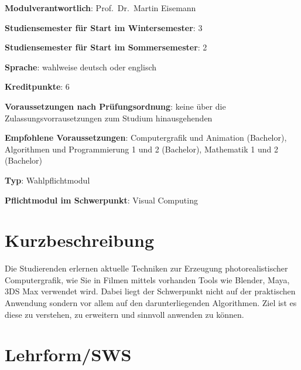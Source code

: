 \begin{modulHead}
\textbf{Modulverantwortlich}: Prof.~Dr.~Martin
Eisemann
\end{modulHead}
\begin{modulHead}
\textbf{Studiensemester für
Start im Wintersemester}:
3
\end{modulHead}
\begin{modulHead}
\textbf{Studiensemester für Start
im Sommersemester}:
2
\end{modulHead}
\begin{modulHead}
\textbf{Sprache}: wahlweise deutsch
oder englisch
\end{modulHead}
\begin{modulHead}
\textbf{Kreditpunkte}:
6
\end{modulHead}
\begin{modulHead}
\textbf{Voraussetzungen nach
Prüfungsordnung}: keine über die Zulassungsvorrausetzungen zum Studium
hinausgehenden
\end{modulHead}
\begin{modulHead}
\textbf{Empfohlene
Voraussetzungen}: Computergrafik und Animation (Bachelor), Algorithmen
und Programmierung 1 und 2 (Bachelor), Mathematik 1 und 2
(Bachelor)
\end{modulHead}
\begin{modulHead}
\textbf{Typ}:
Wahlpflichtmodul
\end{modulHead}
\begin{modulHead}
\textbf{Pflichtmodul
im Schwerpunkt}: Visual Computing
\end{modulHead}


\section*{Kurzbeschreibung\label{/mi-2017/modulbeschreibungen-master/MA_VC_Modul_PhotorealistischeBildsynthese}}\label{kurzbeschreibungpathlabelmi-2017modulbeschreibungen-mastermaux5fvcux5fmodulux5fphotorealistischebildsynthese}

Die Studierenden erlernen aktuelle Techniken zur Erzeugung
photorealistischer Computergrafik, wie Sie in Filmen mittels vorhanden
Tools wie Blender, Maya, 3DS Max verwendet wird. Dabei liegt der
Schwerpunkt nicht auf der praktischen Anwendung sondern vor allem auf
den darunterliegenden Algorithmen. Ziel ist es diese zu verstehen, zu
erweitern und sinnvoll anwenden zu können.

\section*{Lehrform/SWS
\label{/mi-2017/modulbeschreibungen-master/MA_VC_Modul_PhotorealistischeBildsynthese}}\label{lehrformsws-pathlabelmi-2017modulbeschreibungen-mastermaux5fvcux5fmodulux5fphotorealistischebildsynthese}

